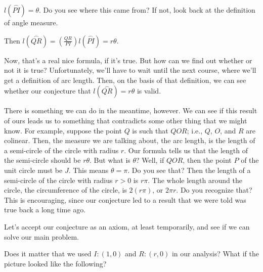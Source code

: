 \documentclass[english]{book}
\newcommand{\arc}[1]{\overset{\frown}{#1} }
\begin{document}
$l(\arc{PI}) = \theta$. Do you see where this came from? If not, look back at the definition of angle measure.

Then $l(\arc{QR}) = (\frac{QR}{PI}) l(\arc{PI}) = r \theta$.

Now, that's a real nice formula, if it's true. But how can we find out whether or not it is true? Unfortunately, we'll have to wait until the next course, where we'll get a definition of arc length. Then, on the basis of that definition, we can see whether our conjecture that $l(\arc{QR}) = r \theta$ is valid. 

There is something we can do in the meantime, however. We can see if this result of ours leads us to something that contradicts some other thing that we might know. For example, suppose the point $Q$ is such that $QOR$; i.e., $Q$, $O$, and $R$ are colinear. Then, the measure we are talking about, the arc length, is the length of a semi-circle of the circle with radius $r$. Our formula tells us that the length of the semi-circle should be $r \theta$. But what is $\theta$? Well, if $QOR$, then the point $P$ of the unit circle must be $J$. This means $\theta = \pi$. Do you see that? Then the length of a semi-circle of the circle with radius $r>0$ is $r \pi$. The whole length around the circle, the circumference of the circle, is $2(r \pi)$, or $2 \pi r$. Do you recognize that? This is encouraging, since our conjecture led to a result that we were told was true back a long time ago.

Let's accept our conjecture as an axiom, at least temporarily, and see if we can solve our main problem.

Does it matter that we used $I:(1,0)$ and $R:(r,0)$ in our analysis? What if the picture looked like the following?
\end{document}
